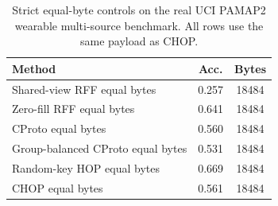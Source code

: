 \begin{table}[t]
\centering
\caption{Strict equal-byte controls on the real UCI PAMAP2 wearable multi-source benchmark. All rows use the same payload as CHOP.}
\label{tab:strict-equal-byte-pamap2}
\begin{tabular}{lcc}
\toprule
Method & Acc. & Bytes \\
\midrule
Shared-view RFF equal bytes & 0.257 & 18484 \\
Zero-fill RFF equal bytes & 0.641 & 18484 \\
CProto equal bytes & 0.560 & 18484 \\
Group-balanced CProto equal bytes & 0.531 & 18484 \\
Random-key HOP equal bytes & 0.669 & 18484 \\
CHOP equal bytes & 0.561 & 18484 \\
\bottomrule
\end{tabular}
\end{table}
